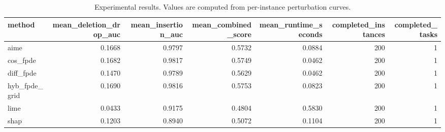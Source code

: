 \begin{table}[t]
\caption{Experimental results. Values are computed from per-instance perturbation curves.}
\label{tab:main_results_computed}
\centering
\begin{tabular}{lrrrrrr}
\toprule
method & mean\_deletion\_drop\_auc & mean\_insertion\_auc & mean\_combined\_score & mean\_runtime\_seconds & completed\_instances & completed\_tasks \\
\midrule
aime & 0.1668 & 0.9797 & 0.5732 & 0.0884 & 200 & 1 \\
cos\_fpde & 0.1682 & 0.9817 & 0.5749 & 0.0462 & 200 & 1 \\
diff\_fpde & 0.1470 & 0.9789 & 0.5629 & 0.0462 & 200 & 1 \\
hyb\_fpde\_grid & 0.1690 & 0.9816 & 0.5753 & 0.0823 & 200 & 1 \\
lime & 0.0433 & 0.9175 & 0.4804 & 0.5830 & 200 & 1 \\
shap & 0.1203 & 0.8940 & 0.5072 & 0.1104 & 200 & 1 \\
\bottomrule
\end{tabular}

\end{table}
